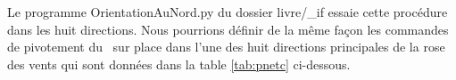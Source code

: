 {
\parindent {}
\medskip

\vspace{\neglskip}\mbox{}\par
\vspace{\neglskip}\mbox{}\par
\vspace{\neglskip}\mbox{\blc \blk{}}\par
\vspace{\neglskip}\mbox{\blc \blk\blk\blk{}}\par
\vspace{\neglskip}\mbox{\blc \blk{}}\par
\vspace{\neglskip}\mbox{\blc \blk\blk\blk{}}\par
\vspace{\neglskip}\mbox{\blc \blk{}}\par
\vspace{\neglskip}\mbox{\blc \blk\blk\blk{}}\par
\vspace{\neglskip}\mbox{\blc \blk{}}\par
\vspace{\neglskip}\mbox{\blc \blk\blk\blk{}}\par
\vspace{\neglskip}\mbox{\blc \blk{}}\par
\vspace{\neglskip}\mbox{\blc \blk\blk\blk{}}\par
\vspace{\neglskip}\mbox{\blc \blk{}}\par
\vspace{\neglskip}\mbox{\blc \blk\blk\blk{}}\par
\vspace{\neglskip}\mbox{\blc \blk{}}\par
\vspace{\neglskip}\mbox{\blc \blk\blk\blk{}}\par

\medskip }

\noindent Le programme {\idt OrientationAuNord.py} du dossier {\idt livre/\_if} essaie cette
procédure dans les huit directions. Nous pourrions définir de la même façon les  commandes de pivotement du \robot\
sur place dans l'une des huit directions principales de la rose des vents qui sont données dans la table
\ref{tab:pnetc} ci-dessous.

